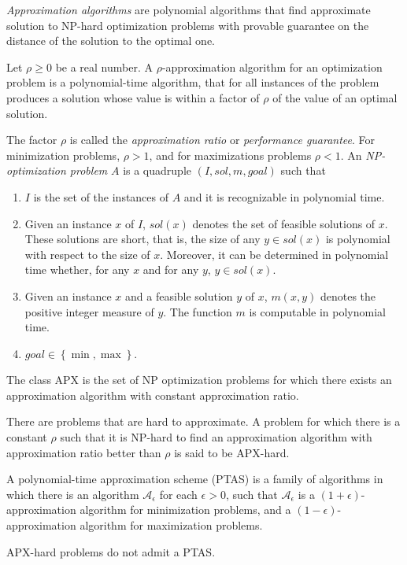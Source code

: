\emph{Approximation algorithms} are polynomial algorithms that find approximate solution to NP-hard optimization problems with provable guarantee on the distance of the solution to the optimal one.
\begin{definition}\cite{williamson11}
Let $\rho\geq0$ be a real number.
A $\rho$-approximation algorithm for an optimization problem is a polynomial-time algorithm, that for all instances of the problem produces a solution whose value is within a factor of
$\rho$ of the value of an optimal solution.
\end{definition}
The factor $\rho$ is called the \emph{approximation ratio} or \emph{performance guarantee}.
For minimization problems, $\rho > 1$, and for maximizations problems $\rho < 1$.
An \emph{NP-optimization problem}  $A$ is a quadruple $(I,sol,m,goal)$ such that \cite{crescenzi97}
\begin{enumerate}
\item $I$ is the set of the instances of $A$ and it is recognizable in polynomial time. 
\item Given an instance $x$ of $I$, $sol(x)$ denotes the set of feasible solutions of $x$. 
	These solutions are short, that is, the size of any $y\in sol(x)$ is polynomial with respect to the size of $x$.
	Moreover, it can be determined in polynomial time whether, for any $x$ and for any $y$, $y \in sol(x)$. 
\item   Given an instance $x$ and a feasible solution $y$ of $x$, $m(x,y)$ denotes the positive integer measure of $y$. 
	The function $m$ is computable in polynomial time. 
\item $goal\in\left\{\min,\max\right\}$.
\end{enumerate}
\begin{definition}
The class APX is the set of NP optimization problems for which there exists an approximation algorithm with constant approximation ratio.
\end{definition}
There are problems that are hard to approximate. 
A problem for which there is a constant $\rho$ such that it is NP-hard to find an approximation algorithm with approximation ratio better than $\rho$ is said to be APX-hard.
\begin{definition}\cite{williamson11}
A polynomial-time approximation scheme (PTAS) is a family of algorithms in which there is an algorithm $\mathcal{A}_\epsilon$ for each $\epsilon > 0$, such that $\mathcal{A}_\epsilon$
is a $(1+\epsilon)$-approximation algorithm for minimization problems, and a $(1-\epsilon)$-approximation algorithm for maximization problems.
\end{definition}
\begin{proposition}
APX-hard problems do not admit a PTAS.
\end{proposition}
